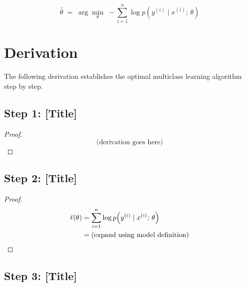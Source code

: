 \documentclass[11pt]{article}
\theoremstyle{definition}
\theoremstyle{remark}
\begin{document}
\[
    \hat{\theta} \;=\; \arg\min_{\theta} \;
        -\sum_{i=1}^{n} \log p\!\left(y^{(i)} \mid x^{(i)};\, \theta\right)
\]

\section{Derivation}

The following derivation establishes the optimal multiclass learning algorithm
step by step.

\subsection{Step 1: [Title]}


\begin{proof}
    \[
        \text{(derivation goes here)}
    \]
\end{proof}

\subsection{Step 2: [Title]}


\begin{proof}
    \begin{align}
        \ell(\theta) &= \sum_{i=1}^{n} \log p\!\left(y^{(i)} \mid x^{(i)};\,\theta\right) \notag \\
                     &= \text{(expand using model definition)} \label{eq:step2}
    \end{align}
\end{proof}

\subsection{Step 3: [Title]}
\end{document}
